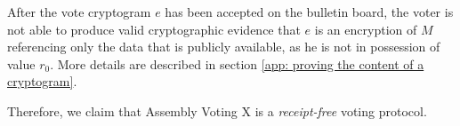 

After the vote cryptogram $e$ has been accepted on the bulletin board, the voter is not able to produce valid cryptographic evidence that $e$ is an encryption of $M$ referencing only the data that is publicly available, as he is not in possession of value $r_0$. More details are described in section \ref{app: proving the content of a cryptogram}.

Therefore, we claim that Assembly Voting X is a \textit{receipt-free} voting protocol.
